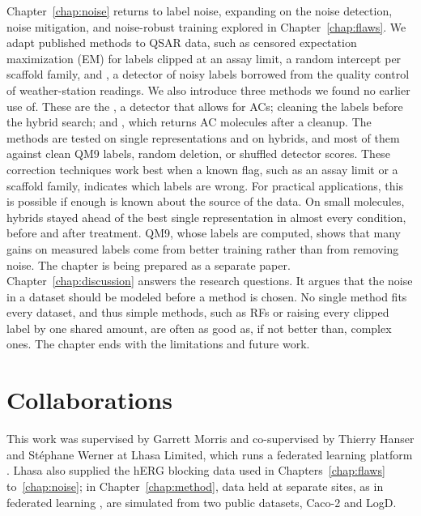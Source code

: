 Chapter~\ref{chap:noise} returns to label noise, expanding on the noise detection, noise mitigation, and noise-robust training explored in  Chapter~\ref{chap:flaws}. We adapt published methods to QSAR data, such as censored expectation maximization (EM) for labels clipped at an assay limit, a random intercept per scaffold family, and , a detector of noisy labels borrowed from the quality control of weather-station readings. We also introduce three methods we found no earlier use of. These are the , a detector that allows for ACs; cleaning the labels before the hybrid search; and , which returns AC molecules after a cleanup. %
The methods are tested on single representations and on hybrids, and most of them against clean QM9 labels, random deletion, or shuffled detector scores. These correction techniques work best when a known flag, such as an assay limit or a scaffold family, indicates which labels are wrong. For practical applications, this is possible if enough is known about the source of the data. On small molecules, hybrids stayed ahead of the best single representation in almost every condition, before and after treatment. QM9, whose labels are computed, shows that many gains on measured labels come from better training rather than from removing noise.
The chapter is being prepared as a separate paper. Chapter~\ref{chap:discussion} answers the research questions. It argues that the noise in a dataset should be modeled before a method is chosen. No single method fits every dataset, and thus simple methods, such as RFs or raising every clipped label by one shared amount, are often as good as, if not better than, complex ones. The chapter ends with the limitations and future work.


\section{Collaborations}


This work was supervised by Garrett Morris and co-supervised by Thierry Hanser and St\'ephane Werner at Lhasa Limited, which runs a federated learning platform \citep{Bassani2023}. Lhasa also supplied the hERG blocking data used in Chapters~\ref{chap:flaws} to~\ref{chap:noise}; in Chapter~\ref{chap:method}, data held at separate sites, as in federated learning \citep{Bassani2023, Hanser2023}, are simulated from two public datasets, Caco-2 and LogD.

